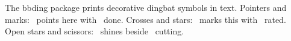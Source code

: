 \documentclass{article}
\begin{document}
The bbding package prints decorative dingbat symbols in text.
Pointers and marks: \HandRight\ points here with \Checkmark\ done.
Crosses and stars: \XSolid\ marks this with \FiveStar\ rated.
Open stars and scissors: \FiveStarOpen\ shines beside \ScissorRight\ cutting.
\end{document}
